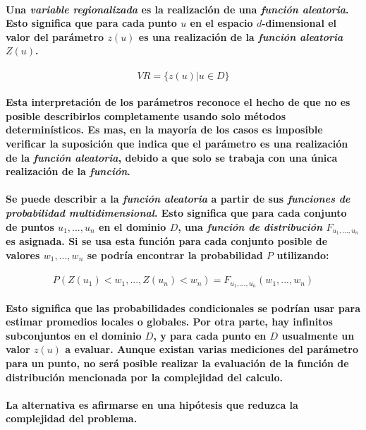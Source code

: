 \paragraph{
Una \emph{variable regionalizada} es la realización de una \emph{función aleatoria}. Esto significa que para cada punto $u$ en el espacio $d$-dimensional el valor del parámetro $z(u)$ es una realización de la \emph{función aleatoria} $Z(u)$. 
}
\begin{equation}
VR = \{ z(u) | u \in D \}
\end{equation}
\paragraph{
Esta interpretación de los parámetros reconoce el hecho de que no es posible describirlos completamente usando solo métodos determinísticos. Es mas, en la mayoría de los casos es imposible verificar la suposición que indica que el parámetro es una realización de la \emph{función aleatoria}, debido a que solo se trabaja con una única realización de la \emph{función}.
}
\paragraph{
Se puede describir a la \emph{función aleatoria} a partir de sus \emph{funciones de probabilidad multidimensional}. Esto significa que para cada conjunto de puntos $u_1,...,u_n$ en el dominio $D$, una \emph{función de distribución} $F_{u_1,...,u_n}$ es asignada. Si se usa esta función para cada conjunto posible de valores $w_1,...,w_n$ se podría encontrar la probabilidad $P$ utilizando:
}
\begin{equation}
P(Z(u_1) < w_1,...,Z(u_n) < w_n) = F_{u_1,...,u_n}(w_1,...,w_n)
\end{equation}
\paragraph{
Esto significa que las probabilidades condicionales se podrían usar para estimar promedios locales o globales. Por otra parte, hay infinitos subconjuntos en el dominio $D$, y para cada punto en $D$ usualmente un valor $z(u)$ a evaluar. Aunque existan varias mediciones del parámetro para un punto, no será posible realizar la evaluación de la función de distribución mencionada por la complejidad del calculo.
}
\paragraph{
La alternativa es afirmarse en una hipótesis que reduzca la complejidad del problema.
}




